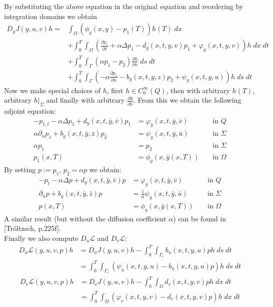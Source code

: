 \documentclass[
12pt, %
a4paper, %
onecolumn, %
portrait %
]{article}
\begin{document}
By substituting the above equation in the original equation and reordering by integration domains we obtain
\begin{align*}
D_y J(y,u,v) h = & \int_{\Omega} (\phi_y(x,y) - p_1(T)) h(T) \; dx \\
& + \int_{0}^{T} \int_{\Omega} (\frac{\partial p_1}{\partial t} + \alpha \Delta p_1 - d_y(x,t,y,v) p_1 + \varphi_y(x,t,y, v)) h \; dx \; dt  \\
& + \int_{0}^{T} \int_{\Gamma} (\alpha p_1 - p_2) \frac{\partial h}{\partial n} \; ds \; dt \\
& + \int_{0}^{T} \int_{\Gamma} (- \alpha \frac{\partial p_1}{\partial n} - b_y(x,t,y,z) p_2 + \psi_y(x,t,y, u))  h \; ds \; dt
\end{align*}
Now we make special choices of $h$, first $h \in C_0^\infty(Q)$, then with arbitrary $h(T)$, arbitrary $h|_\Sigma$  and finally with arbitrary $\frac{\partial h}{\partial n}$. From this we obtain the following adjoint equation:
\begin{equation}
\begin{alignedat}{2}
-p_{1,t} - \alpha \Delta p_1 + d_y(x,t,\bar{y}, \bar{v}) p_1 &= \varphi_y(x,t,\bar{y}, \bar{v}) &&\text{ in } Q \\
\alpha \partial_n p_1 + b_y(x,t,\bar{y}, \bar{z}) p_2 &= \psi_y(x,t,\bar{y}, \bar{u}) &&\text{ in } \Sigma \\
\alpha p_1 &= p_2 &&\text{ in } \Sigma \\
p_1(x,T) &= \phi_y(x, \bar{y}(x,T)) &&\text{ in } \Omega
\label{eq:adjoint-pde-preliminary}
\end{alignedat}
\end{equation}
By setting $p := p_1$, $p_2 = \alpha p$ we obtain:
\begin{equation}
\begin{alignedat}{2}
-p_t - \alpha \Delta p + d_y(x,t,\bar{y}, \bar{v}) p &= \varphi_y(x,t,\bar{y}, \bar{v}) &&\text{ in } Q \\
\partial_n p + b_y(x,t,\bar{y}, \bar{z}) p &= \frac{1}{\alpha}\psi_y(x,t,\bar{y}, \bar{u}) &&\text{ in } \Sigma \\
p(x,T) &= \phi_y(x, \bar{y}(x,T)) &&\text{ in } \Omega
\label{eq:adjoint-pde}
\end{alignedat}
\end{equation}
A similar result (but without the diffusion coefficient $\alpha$) can be found in [Tr\"oltzsch, p.225f].\\
Finally we also compute $D_u \mathcal{L}$ and $D_v \mathcal{L}$:
\begin{align*}
D_u \mathcal{L}(y,u,v, p) h & = D_u J(y,u,v) h - \int_{0}^{T} \int_{\Gamma_c} b_u(x,t,y,u) p h \; ds \; dt \\
& = \int_{0}^{T} \int_{\Gamma_c}  (\psi_u(x,t,y,u) -  b_u(x,t,y,u) p)  h \; ds \; dt
\end{align*}
\begin{align*}
D_v \mathcal{L}(y,u,v, p) h & = D_v J(y,u,v) h - \int_{0}^{T} \int_{\Omega} d_v(x,t,y,v) p h \; dx \; dt \\
& = \int_{0}^{T} \int_{\Omega}  (\varphi_v(x,t,y,v) -  d_v(x,t,y,v) p)  h \; dx \; dt
\end{align*}
\end{document}
